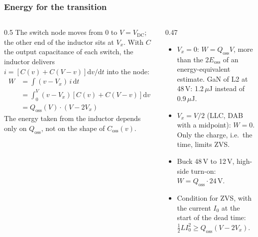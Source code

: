 \begin{frame}
	\frametitle{Energy for the transition}
	\begin{columns}[T]
		\begin{column}{0.5\textwidth}
			\footnotesize
			The switch node moves from 0 to $V=V_\mathrm{DC}$; the other end of the inductor sits at $V_x$. With $C$ the output capacitance of each switch, the inductor delivers $i=\left[C(v)+C(V-v)\right]\mathrm{d}v/\mathrm{d}t$ into the node:
			\begin{align*}
				W & =\int(v-V_x)\,i\,\mathrm{d}t                       \\
				  & =\int_0^V(v-V_x)\left[C(v)+C(V-v)\right]\mathrm{d}v \\
				  & =Q_\mathrm{oss}(V)\cdot(V-2V_x)
			\end{align*}
			The energy taken from the inductor depends only on $Q_\mathrm{oss}$, not on the shape of $C_\mathrm{oss}(v)$.
		\end{column}
		\begin{column}{0.47\textwidth}
			\footnotesize
			\begin{itemize}
				\item $V_x=0$: $W=Q_\mathrm{oss}V$, more than the $2E_\mathrm{oss}$ of an energy-equivalent estimate. GaN of L2 at 48\,V: 1.2\,$\mu$J instead of 0.9\,$\mu$J.
				\item $V_x=V/2$ (LLC, DAB with a midpoint): $W=0$. Only the charge, i.e.\ the time, limits ZVS.
				\item Buck 48\,V to 12\,V, high-side turn-on: $W=Q_\mathrm{oss}\cdot24$\,V.
				\item Condition for ZVS, with the current $I_0$ at the start of the dead time: $\frac{1}{2}LI_0^2\geq Q_\mathrm{oss}(V-2V_x)$.
			\end{itemize}
		\end{column}
	\end{columns}
\end{frame}

